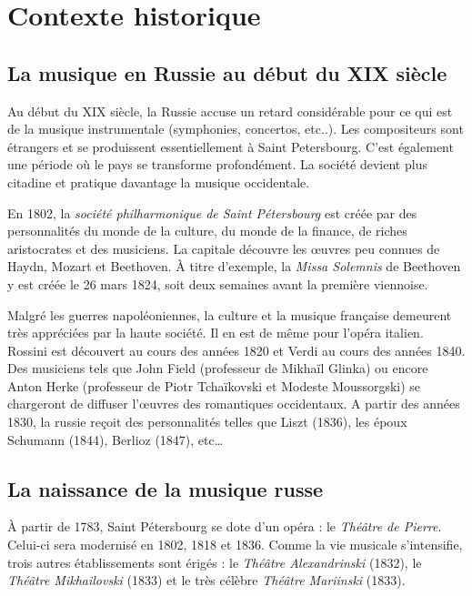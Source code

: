 
\chapter{Contexte historique}

\section{La musique en Russie au début du XIX\ieme{} siècle}

Au début du XIX\ieme{} siècle, la Russie accuse un retard considérable pour ce qui est de la musique instrumentale (symphonies, concertos, etc..). Les compositeurs sont étrangers et se produissent essentiellement à Saint Petersbourg. C'est également une période où le pays se transforme profondément. La société devient plus citadine et pratique davantage la musique occidentale.

En 1802, la \emph{société philharmonique de Saint Pétersbourg} est créée par des personnalités du monde de la culture, du monde de la finance, de riches aristocrates et des musiciens. La capitale découvre les œuvres peu connues de Haydn, Mozart et Beethoven. À titre d'exemple, la \emph{Missa Solemnis} de Beethoven y est créée le 26 mars 1824, soit deux semaines avant la première viennoise.

Malgré les guerres napoléoniennes, la culture et la musique française demeurent très appréciées par la haute société. Il en est de même pour l'opéra italien. Rossini est découvert au cours des années 1820 et Verdi au cours des années 1840. Des musiciens tels que John Field (professeur de Mikhaïl Glinka) ou encore Anton Herke (professeur de Piotr Tchaïkovski et Modeste Moussorgski) se chargeront de diffuser l'œuvres des romantiques occidentaux. A partir des années 1830, la russie reçoit des personnalités telles que Liszt (1836), les époux Schumann (1844), Berlioz (1847), etc\dots

\section{La naissance de la musique russe}

À partir de 1783, Saint Pétersbourg se dote d'un opéra : le \emph{Théâtre de Pierre}. Celui-ci sera modernisé en 1802, 1818 et 1836. Comme la vie musicale s'intensifie, trois autres établissements sont érigés : le \emph{Théâtre Alexandrinski} (1832), le \emph{Théâtre Mikhailovski} (1833) et le très célèbre \emph{Théâtre Mariinski} (1833).

